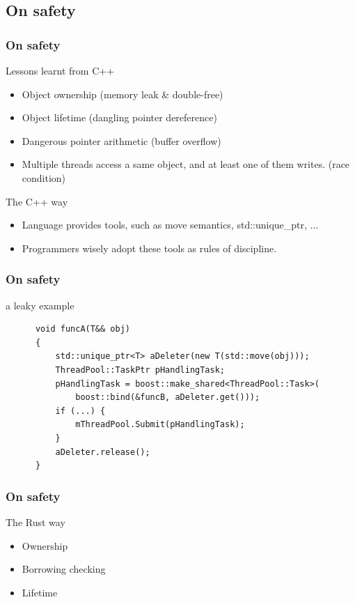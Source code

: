 \documentclass[lualatex,utf8]{beamer}
\begin{document}
\subsection{On safety}

\begin{frame}
  \frametitle{On safety}
  \begin{block}{Lessons learnt from C++}
    \begin{itemize}
    \item Object ownership (memory leak \& double-free)
    \item Object lifetime (dangling pointer dereference)
    \item Dangerous pointer arithmetic (buffer overflow)
    \item Multiple threads access a same object, and at least one of them writes. (race condition)
    \end{itemize}
  \end{block}
  \begin{exampleblock}{The C++ way}
    \begin{itemize}
    \item Language provides tools, such as move semantics, std::unique\_ptr, ...
    \item Programmers wisely adopt these tools as rules of discipline.
    \end{itemize}
  \end{exampleblock}
\end{frame}

\begin{frame}[fragile]
  \frametitle{On safety}
  \begin{alertblock}{a leaky example}
    \begin{verbatim}
      void funcA(T&& obj)
      {
          std::unique_ptr<T> aDeleter(new T(std::move(obj)));
          ThreadPool::TaskPtr pHandlingTask;
          pHandlingTask = boost::make_shared<ThreadPool::Task>(
              boost::bind(&funcB, aDeleter.get()));
          if (...) {
              mThreadPool.Submit(pHandlingTask);
          }
          aDeleter.release();
      }
    \end{verbatim}
  \end{alertblock}
\end{frame}

\begin{frame}
  \frametitle{On safety}
  \begin{block}{The Rust way}
    \begin{itemize}
    \item Ownership
    \item Borrowing checking
    \item Lifetime
    \end{itemize}
  \end{block}
\end{frame}
\end{document}
